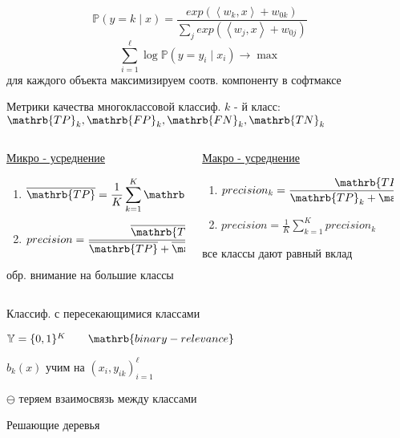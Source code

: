 \documentclass[final]{beamer}
\newlength{\sepwidth}
\newlength{\colwidth}
\newcommand{\separatorcolumn}{\begin{column}{\sepwidth}\end{column}}
\begin{document}
\begin{frame}[t]
\begin{columns}[t]
\separatorcolumn
\begin{column}{\colwidth}
\[\mathbb{P}(y = k \; | \; x) = \frac{exp(\left< w_k, x\right> + w_{0k})}{\sum\limits_{j} exp(\left< w_j, x\right> + w_{0j})}\]
\[\sum\limits_{i = 1}^{\ell} \log \mathbb{P} (y = y_i \; | \; x_i ) \to \max\]
{\small для каждого объекта максимизируем соотв. компоненту в софтмаксе}

\begin{block}{Метрики качества многоклассовой классиф.}
$k$ {\small - й класс: } $\mathrb{TP}_k, \mathrb{FP}_k, \mathrb{FN}_k, \mathrb{TN}_k$
\begin{columns}
\begin{column}{0.12\paperwidth}
{\small \underline{Микро - усреднение}}

\begin{enumerate}
    \item $\displaystyle{\overline{\mathrb{TP}} = \frac{1}{K} \sum\limits_{k = 1}^K \mathrb{TP}_k}$
    \item $\displaystyle{precision = \frac{\overline{\mathrb{TP}}}{\overline{\mathrb{TP}} + \overline{\mathrb{FP}}}}$
\end{enumerate}
{\small обр. внимание на большие классы}
\end{column}

\begin{column}{0.12\paperwidth}
{\small \underline{Макро - усреднение}}
\begin{enumerate}
    \item $\displaystyle{precision_k = \frac{\mathrb{TP}_k}{\mathrb{TP}_k + \mathrb{FP}_k}}$
    \item $\displaystyle{precision = \frac{1}{K} \sum\limits_{k = 1}^K precision_k}$
\end{enumerate}
{\small все классы дают равный вклад}
\end{column}
\end{columns}
\end{block}
\begin{block}{Классиф. с пересекающимися классами}

$\mathbb{Y} = \{0, 1\}^K \quad \quad \mathrb{binary - relevance}$

$b_k(x)$ {\small учим на } $(x_i, y_{ik})_{i = 1}^{\ell}$

$\ominus$ {\small теряем взаимосвязь между классами}
\end{block}
\begin{block}{Решающие деревья}


\end{block}
\end{column}
\end{columns}
\end{frame}
\end{document}
